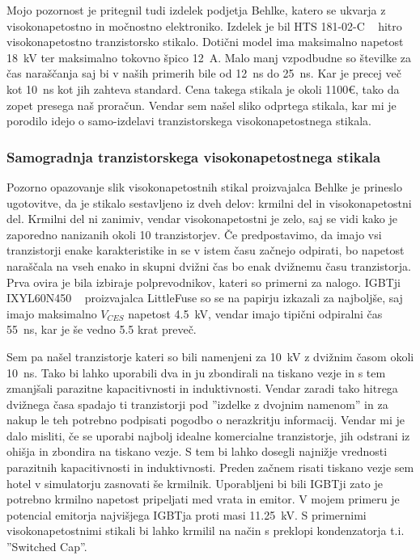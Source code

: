 \documentclass[a4paper,twoside,openright,12pt,Slovene]{book}
\begin{document}
	Mojo pozornost je pritegnil tudi izdelek podjetja Behlke, katero se ukvarja z visokonapetostno in močnostno elektroniko. Izdelek je bil HTS 181-02-C ~\cite{Behlke:HTS181-02-C} hitro visokonapetostno tranzistorsko stikalo. Dotični model ima maksimalno napetost \SI{18}{\kilo\volt} ter maksimalno tokovno špico \SI{12}{\ampere}. Malo manj vzpodbudne so številke za čas naraščanja saj bi v naših primerih bile od \SI{12}{\nano\second} do \SI{25}{\nano\second}. Kar je precej več kot \SI{10}{\nano\second} kot jih zahteva standard. Cena takega stikala je okoli 1100\euro , tako da zopet presega naš proračun. Vendar sem našel sliko odprtega stikala, kar mi je porodilo idejo o samo-izdelavi tranzistorskega visokonapetostnega stikala.
	
	\subsubsection{Samogradnja tranzistorskega visokonapetostnega stikala} \label{Samogradnja tranzistorskega visokonapetostnega stikala}
	
	Pozorno opazovanje slik visokonapetostnih stikal proizvajalca Behlke je prineslo ugotovitve, da je stikalo sestavljeno iz dveh delov: krmilni del in visokonapetostni del. Krmilni del ni zanimiv, vendar visokonapetostni je zelo, saj se vidi kako je zaporedno nanizanih okoli 10 tranzistorjev. Če predpostavimo, da imajo vsi tranzistorji enake karakteristike in se v istem času začnejo odpirati, bo napetost naraščala na vseh enako in skupni dvižni čas bo enak dvižnemu času tranzistorja. Prva ovira je bila izbiraje polprevodnikov, kateri so primerni za nalogo. IGBTji IXYL60N450 ~\cite{IXYS:IXYL60N450} proizvajalca LittleFuse so se na papirju izkazali za najboljše, saj imajo maksimalno \(V_{CES}\) napetost \SI{4.5}{\kilo\volt}, vendar imajo tipični odpiralni čas \SI{55}{\nano\second}, kar je še vedno 5.5 krat preveč. 

    Sem pa našel tranzistorje kateri so bili namenjeni za \SI{10}{\kilo\volt} z dvižnim časom okoli \SI{10}{\nano\second}. Tako bi lahko uporabili dva in ju zbondirali na tiskano vezje in s tem zmanjšali parazitne kapacitivnosti in induktivnosti. Vendar zaradi tako hitrega dvižnega časa spadajo ti tranzistorji pod ''izdelke z dvojnim namenom'' in za nakup le teh potrebno podpisati pogodbo o nerazkritju informacij.
Vendar mi je dalo misliti, če se uporabi najbolj idealne komercialne tranzistorje, jih odstrani iz ohišja in zbondira na tiskano vezje. S tem bi lahko dosegli najnižje vrednosti parazitnih kapacitivnosti in induktivnosti. Preden začnem risati tiskano vezje sem hotel v simulatorju zasnovati še krmilnik. Uporabljeni bi bili IGBTji zato je potrebno krmilno napetost pripeljati med vrata in emitor. V mojem primeru je potencial emitorja najvišjega IGBTja proti masi \SI{11.25}{\kilo\volt}. S primernimi visokonapetostnimi stikali bi lahko krmilil na način s preklopi kondenzatorja t.i. ''Switched Cap''.
\end{document}
